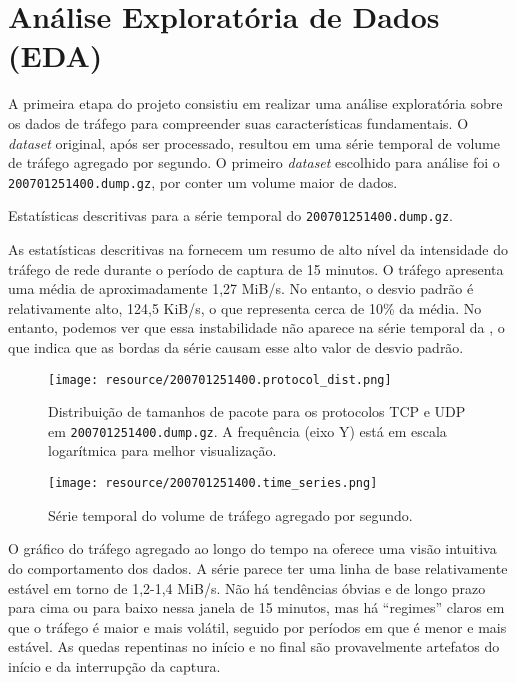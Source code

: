 \section{Análise Exploratória de Dados (EDA)}

A primeira etapa do projeto consistiu em realizar uma análise exploratória sobre os dados de tráfego para
compreender suas características fundamentais.
O \emph{dataset} original, após ser processado, resultou em uma série temporal de volume de tráfego agregado
por segundo. O primeiro \emph{dataset} escolhido para análise foi o \texttt{200701251400.dump.gz}, por conter
um volume maior de dados.

\begin{table}[!htb]
    \centering
    \caption{Estatísticas descritivas para a série temporal do \texttt{200701251400.dump.gz}.}
    \label{tab:eda-describe}
    
\end{table}

As estatísticas descritivas na  fornecem um resumo de alto nível da intensidade do
tráfego de rede durante o período de captura de 15 minutos. O tráfego apresenta uma média de aproximadamente
1,27 MiB/s. No entanto, o desvio padrão é relativamente alto, 124,5 KiB/s, o que representa cerca de 10\% da
média. No entanto, podemos ver que essa instabilidade não aparece na série temporal da
, o que indica que as bordas da série causam esse alto valor de desvio padrão.

\begin{figure}[!htb]
    \centering
    \texttt{[image: resource/200701251400.protocol\_dist.png]}
    \caption{Distribuição de tamanhos de pacote para os protocolos TCP e UDP em
        \texttt{200701251400.dump.gz}. A frequência (eixo Y) está em
    escala logarítmica para melhor visualização.}
    \label{fig:eda-protocol-dist}
\end{figure}

\begin{figure}[!htb]
    \centering
    \texttt{[image: resource/200701251400.time\_series.png]}
    \caption{Série temporal do volume de tráfego agregado por segundo.}
    \label{fig:eda-timeseries}
\end{figure}

O gráfico do tráfego agregado ao longo do tempo na  oferece uma visão intuitiva do
comportamento dos dados. A série parece ter uma linha de base relativamente estável em torno de 1,2-1,4
MiB/s. Não há tendências óbvias e de longo prazo para cima ou para baixo nessa janela de 15 minutos, mas há
``regimes'' claros em que o tráfego é maior e mais volátil, seguido por períodos em que é menor e mais
estável. As quedas repentinas no início e no final são provavelmente artefatos do início e da interrupção da captura.


